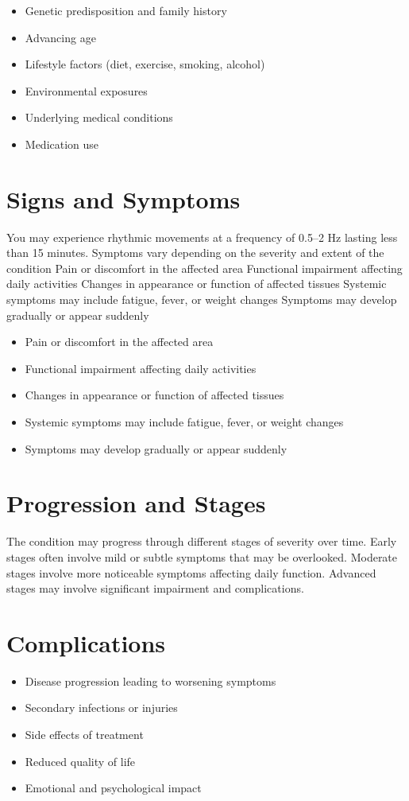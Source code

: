 \begin{itemize}[noitemsep]
  \item Genetic predisposition and family history
  \item Advancing age
  \item Lifestyle factors (diet, exercise, smoking, alcohol)
  \item Environmental exposures
  \item Underlying medical conditions
  \item Medication use
\end{itemize}
\section{Signs and Symptoms}
You may experience rhythmic movements at a frequency of 0.5--2 Hz lasting less than 15 minutes. Symptoms vary depending on the severity and extent of the condition Pain or discomfort in the affected area Functional impairment affecting daily activities Changes in appearance or function of affected tissues Systemic symptoms may include fatigue, fever, or weight changes Symptoms may develop gradually or appear suddenly

\begin{itemize}[noitemsep]
  \item Pain or discomfort in the affected area
  \item Functional impairment affecting daily activities
  \item Changes in appearance or function of affected tissues
  \item Systemic symptoms may include fatigue, fever, or weight changes
  \item Symptoms may develop gradually or appear suddenly
\end{itemize}
\section{Progression and Stages}
The condition may progress through different stages of severity over time. Early stages often involve mild or subtle symptoms that may be overlooked. Moderate stages involve more noticeable symptoms affecting daily function. Advanced stages may involve significant impairment and complications.
\section{Complications}
\begin{itemize}[noitemsep]
  \item Disease progression leading to worsening symptoms
  \item Secondary infections or injuries
  \item Side effects of treatment
  \item Reduced quality of life
  \item Emotional and psychological impact
\end{itemize}

